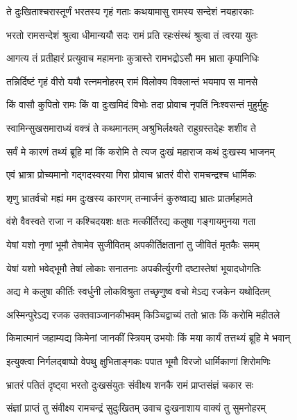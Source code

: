\twolineshloka
{ते दुःखिताश्चरास्तूर्णं भरतस्य गृहं गताः}
{कथयामासु रामस्य सन्देशं नयहारकाः}%

\twolineshloka
{भरतो रामसन्देशं श्रुत्वा धीमान्ययौ सदः}
{रामं प्रति रहःसंस्थं श्रुत्वा तं त्वरया युतः}%

\twolineshloka
{आगत्य तं प्रतीहारं प्रत्युवाच महामनाः}
{कुत्रास्ते रामभद्रोऽसौ मम भ्राता कृपानिधिः}%

\twolineshloka
{तन्निर्दिष्टं गृहं वीरो ययौ रत्नमनोहरम्}
{रामं विलोक्य विक्लान्तं भयमाप स मानसे}%

\twolineshloka
{किं वासौ कुपितो रामः किं वा दुःखमिदं विभोः}
{तदा प्रोवाच नृपतिं निःश्वसन्तं मुहुर्मुहुः}%

\twolineshloka
{स्वामिन्सुखसमाराध्यं वक्त्रं ते कथमानतम्}
{अश्रुभिर्लक्ष्यते राहुग्रस्तदेहः शशीव ते}%

\twolineshloka
{सर्वं मे कारणं तथ्यं ब्रूहि मां किं करोमि ते}
{त्यज दुःखं महाराज कथं दुःखस्य भाजनम्}%

\twolineshloka
{एवं भ्रात्रा प्रोच्यमानो गद्गदस्वरया गिरा}
{प्रोवाच भ्रातरं वीरो रामचन्द्रश्च धार्मिकः}%

\twolineshloka
{शृणु भ्रातर्वचो मह्यं मम दुःखस्य कारणम्}
{तन्मार्जनं कुरुष्वाद्य भ्रातः प्रातर्महामते}%

\twolineshloka
{वंशे वैवस्वते राजा न कश्चिदयशः क्षतः}
{मत्कीर्तिरद्य कलुषा गङ्गायमुनया गता}%

\twolineshloka
{येषां यशो नृणां भूमौ तेषामेव सुजीवितम्}
{अपकीर्तिक्षतानां तु जीवितं मृतकैः समम्}%

\twolineshloka
{येषां यशो भवेद्भूमौ तेषां लोकाः सनातनाः}
{अपकीर्त्युरगी दष्टास्तेषां भूयादधोगतिः}%

\twolineshloka
{अद्य मे कलुषा कीर्तिः स्वर्धुनी लोकविश्रुता}
{तच्छृणुष्व वचो मेऽद्य रजकेन यथोदितम्}%

\twolineshloka
{अस्मिन्पुरेऽद्य रजक उक्तवाञ्जानकीभवम्}
{किञ्चिद्वाच्यं ततो भ्रातः किं करोमि महीतले}%

\twolineshloka
{किमात्मानं जहाम्यद्य किमेनां जानकीं स्त्रियम्}
{उभयोः किं मया कार्यं तत्तथ्यं ब्रूहि मे भवान्}%

\twolineshloka
{इत्युक्त्वा निर्गलद्बाष्पो वेपथु क्षुभिताङ्गकः}
{पपात भूमौ विरजो धार्मिकाणां शिरोमणिः}%

\twolineshloka
{भ्रातरं पतितं दृष्ट्वा भरतो दुःखसंयुतः}
{संवीक्ष्य शनकै रामं प्राप्तसंज्ञं चकार सः}%

\twolineshloka
{संज्ञां प्राप्तं तु संवीक्ष्य रामचन्द्रं सुदुःखितम्}
{उवाच दुःखनाशाय वाक्यं तु सुमनोहरम्}%


